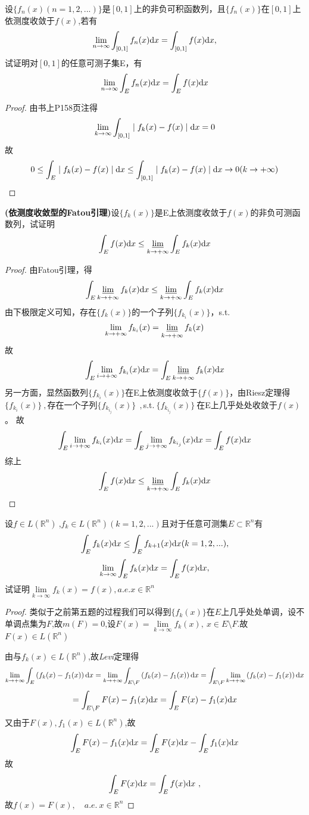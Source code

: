 设$\{f_n(x)(n=1,2,...)\}$是$[0,1]$上的非负可积函数列，且$\{f_n(x)\}$在$[0,1]$上依测度收敛于$f(x)$,若有$$\lim\limits_{n \to \infty}\int_{[0,1]} f_n(x) \mathrm{d}x=\int_{[0,1]} f(x) \mathrm{d}x,$$试证明对$[0,1]$的任意可测子集E，有$$\lim\limits_{n \to \infty}\int_{E} f_n(x) \mathrm{d}x=\int_{E} f(x) \mathrm{d}x$$
\begin{proof}
	由书上P158页注得$$\lim\limits_{k \to \infty} \int_{[0,1]} \mid f_k(x)-f(x)\mid \mathrm{d}x=0$$故$$0\leq \int_{E} \mid f_k(x)-f(x)\mid \mathrm{d}x \leq  \int_{[0,1]} \mid f_k(x)-f(x)\mid \mathrm{d}x \to 0 (k\to +\infty)$$
\end{proof}

 \textbf{(依测度收敛型的Fatou引理)}设$\{f_k(x)\}$是E上依测度收敛于$f(x)$的非负可测函数列，试证明$$\int_E f(x) \mathrm{d}x \leq \varliminf_{k \to +\infty}\int_E f_k(x) \mathrm{d}x$$
\begin{proof}
由Fatou引理，得$$\int_E \varliminf_{k \to +\infty} f_k(x) \mathrm{d}x\leq \varliminf_{k \to +\infty}\int_E f_k(x) \mathrm{d}x$$
由下极限定义可知，存在$\{f_k(x)\}$的一个子列$\{f_{k_i}(x)\}$，s.t.$$\lim\limits_{k \to +\infty} f_{k_i}(x)=\varliminf_{k \to +\infty} f_k(x)$$ 
故$$\int_E \lim\limits_{i \to +\infty} f_{k_i}(x) \mathrm{d}x = \int_E \varliminf_{k \to +\infty} f_k(x) \mathrm{d}x$$
另一方面，显然函数列$\{f_{k_i}(x)\}$在E上依测度收敛于$\{f(x)\}$，由Riesz定理得$\{f_{k_i}(x)\}\ ,$存在一个子列$\{f_{k_{i_j}}(x)\}\ \  ,$s.t.$\ \{f_{k_{i_j}}(x)\}\ $在E上几乎处处收敛于$f(x)$。
故$$\int_E \lim\limits_{i \to +\infty} f_{k_i}(x) \mathrm{d}x=\int_E \lim\limits_{j \to +\infty} f_{k_{i_j}}(x) \mathrm{d}x=\int_E f(x)\mathrm{d}x$$
综上$$\int_E f(x) \mathrm{d}x \leq \varliminf_{k \to +\infty}\int_E f_k(x) \mathrm{d}x$$
\end{proof}


设$f\in L(\mathbb{R}^n) \ $,$f_k\in L(\mathbb{R}^n)(k=1,2,...)$且对于任意可测集$E \subset \mathbb{R}^{n}$有$$\int_{E} f_k(x) \mathrm{d}x \leq \int_{E} f_{k+1}(x) \mathrm{d}x(k=1,2,...),$$
$$\lim\limits_{k \to \infty}\int_{E} f_k(x) \mathrm{d}x=\int_{E} f(x) \mathrm{d}x,$$ 试证明$\lim\limits_{k \to \infty}f_k(x)=f(x),  a.e.x \in \mathbb{R}^n$
\begin{proof}
类似于之前第五题的过程我们可以得到$\{f_k(x)\}$在$E$上几乎处处单调，设不单调点集为$F$,故$m(F)=0$,设$F(x)=\lim\limits_{k\to \infty}f_k(x),\ x\in E\setminus F$.故$F(x)\in L(\mathbb{R}^n)$\par 
由与$f_k(x)\in L(\mathbb{R}^n)$,故\emph{Levi}定理得$$\lim\limits_{k\to+\infty}\int_{E}\left(f_k(x)-f_1(x)\right)\mathrm{d}x
=\lim\limits_{k\to+\infty}\int_{E\setminus F}\left(f_k(x)-f_1(x)\right)\mathrm{d}x
=\int_{E\setminus F}\lim\limits_{k\to+\infty}\left(f_k(x)-f_1(x)\right)\mathrm{d}x$$
$$=\int_{E\setminus F}F(x)-f_1(x)\mathrm{d}x=\int_{E}F(x)-f_1(x)\mathrm{d}x$$
又由于$F(x),f_1(x)\in L(\mathbb{R}^n)$,故$$\int_{E}F(x)-f_1(x)\mathrm{d}x=\int_{E}F(x)\mathrm{d}x-\int_{E}f_1(x)\mathrm{d}x$$
故$$\int_{E}F(x)\di{x}=\int_{E}f(x)\di{x}\ ,$$
故$f(x)=F(x),\quad a.e.\ x\in \mathbb{R}^n$
\end{proof}

